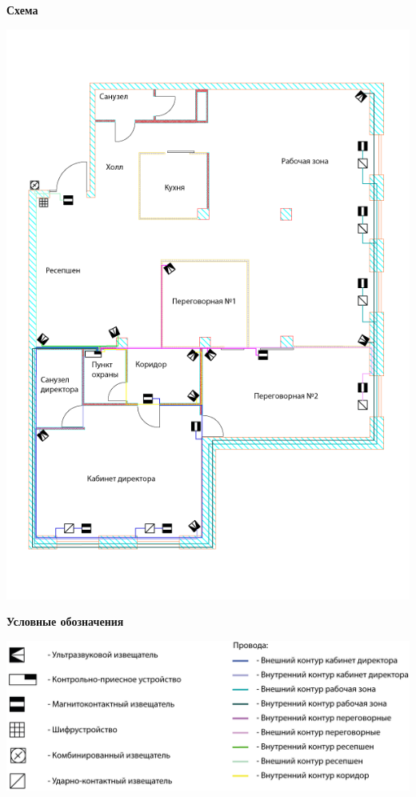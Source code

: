 \documentclass[a4paper,14pt]{extarticle}
\begin{document}
    \begin{center}
        \textbf{Схема}
    \end{center}
    \vspace{-6ex}
    \begin{center}
        \includegraphics[scale=0.65, angle=90]{pics/Sensors.png}
    \end{center}
    \textbf{Условные обозначения}
    \begin{center}
        \includegraphics[scale=0.65]{pics/Sensors(mark).png}
    \end{center}
\end{document}
